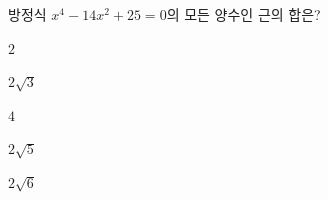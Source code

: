 방정식 $x^4-14x^2+25=0$의 모든 양수인 근의 합은?
\begin{choices32}{\rule[-3ex]{0pt}{8ex}$2$}{\rule[-3ex]{0pt}{8ex}$2\sqrt{3}$}{\rule[-3ex]{0pt}{8ex}$4$}{\rule[-3ex]{0pt}{8ex}$2\sqrt{5}$}{\rule[-3ex]{0pt}{8ex}$2\sqrt{6}$}\end{choices32}
